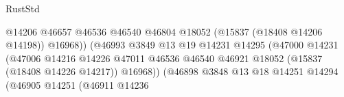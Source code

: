\begin{lexlean}{RustStd}
\begin{coremodule}
{\begin{coremodule}
{{{{{{{{{{{{{{{{{{{{{{{{{{{{{{{{{{{{{{{{{{{{{{{{{{{{{{{{{{{{                                                                @14206
                                                                @46657
                                                                @46536
                                                                @46540
                                                                @46804
                                                                @18052
                                                                (@15837 (@18408 @14206 @14198))
                                                                @16968))
                                                            (@46993
                                                              @3849
                                                              @13
                                                              @19
                                                              @14231
                                                              @14295
                                                              (@47000
                                                                @14231
                                                                (@47006
                                                                  @14216
                                                                  @14226
                                                                  @47011
                                                                  @46536
                                                                  @46540
                                                                  @46921
                                                                  @18052
                                                                  (@15837 (@18408 @14226 @14217))
                                                                  @16968))
                                                              (@46898
                                                                @3848
                                                                @13
                                                                @18
                                                                @14251
                                                                @14294
                                                                (@46905
                                                                  @14251
                                                                  (@46911
                                                                    @14236
}}}}}}}}}}}}}}}}}}}}}}}}}}}}}}}}}}}}}}}}}}}}}}}}}}}}}}}}}}}}
\end{coremodule}}
\end{coremodule}
\end{lexlean}
